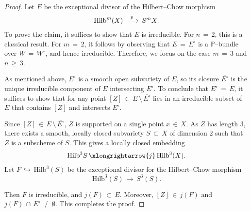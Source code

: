 \documentclass[12pt,reqno]{amsart}
\theoremstyle{definition}
\numberwithin{equation}{section}
\begin{document}
\begin{proof}
Let $E$ be the exceptional divisor of  the Hilbert--Chow morphism 
$$\textnormal{Hilb}^{m}(X)\,\xrightarrow{\,\,\,p\,\,\,}\, S^{m} X.$$ 
To prove the claim, it suffices to show that $E$ is irreducible. For $n\,=\,2$, this is a classical result. For $m\,=\,2$, it follows by observing that $E\,=\,E^{\circ}$ is a $\mathbb{P}$--bundle over $W\,=\,W^{\circ}$, and hence irreducible. Therefore, we focus on the case $m\,=\,3$ and $n\,\geq\, 3$.

As mentioned above, $E^{\circ}$ is a smooth open subvariety of $E$, so its closure $\overline{E^{\circ}}$ is the unique irreducible component of $E$ intersecting $E^{\circ}$. To conclude that $\overline{E^{\circ}}\,=\, E$, it suffices to show that for any point $[Z]\,\in\,E\,\setminus\, \overline{E^{\circ}}$ lies in an irreducible subset of $E$ that contains $[Z]$ and intersects $E^{\circ}$. 

Since $[Z]\,\in\, E\,\setminus\,\overline{E^{\circ}}$, $Z$ is supported on a single point $x\,\in\, X$. As $Z$ has length $3$, there exists a smooth, locally closed subvariety $S\,\subset\,X$ of dimension $2$ such that $Z$ is a subscheme of $S$. This gives a locally closed embedding 
\begin{equation*}
\textrm{Hilb}^{3}S\,\xlongrightarrow{j}\,\textrm{Hilb}^{3}(X).
\end{equation*}
Let $F\,\hookrightarrow\, \textrm{Hilb}^{3}(S)$ be the exceptional divisor for the Hilbert--Chow morphism
\begin{equation*}
\textrm{Hilb}^{3}(S)\,\longrightarrow\, S^{3}(S).
\end{equation*}

Then $F$ is irreducible, and $j(F)\,\subset\, E$. Moreover, $[Z]\,\in\,j(F)$ and $j(F)\,\cap\, E^{\circ}\,\neq\,\emptyset$. This completes the proof.
\end{proof}
\end{document}
